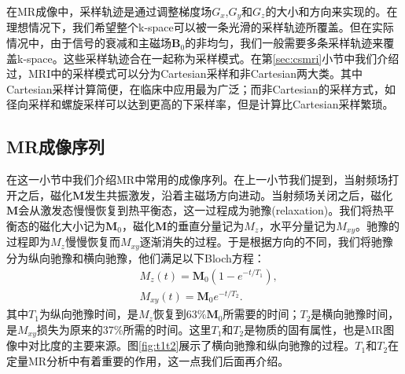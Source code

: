 在MR成像中，采样轨迹是通过调整梯度场$G_x$,$G_y$和$G_z$的大小和方向来实现的。在理想情况下，我们希望整个k-space可以被一条光滑的采样轨迹所覆盖。但在实际情况中，由于信号的衰减和主磁场$\mathrm{\textbf{B}}_0$的非均匀，我们一般需要多条采样轨迹来覆盖k-space。这些采样轨迹合在一起称为采样模式。在第\ref{sec:csmri}小节中我们介绍过，MRI中的采样模式可以分为Cartesian采样和非Cartesian两大类。其中Cartesian采样计算简便，在临床中应用最为广泛；而非Cartesian的采样方式，如径向采样和螺旋采样可以达到更高的下采样率，但是计算比Cartesian采样繁琐。

\subsection{MR成像序列}
在这一小节中我们介绍MR中常用的成像序列。在上一小节我们提到，当射频场打开之后，磁化$\mathrm{\textbf{M}}$发生共振激发，沿着主磁场方向进动。当射频场关闭之后，磁化$\mathrm{\textbf{M}}$会从激发态慢慢恢复到热平衡态，这一过程成为驰豫(relaxation)。我们将热平衡态的磁化大小记为$\mathrm{\textbf{M}}_0$，磁化$\mathrm{\textbf{M}}$的垂直分量记为$M_z$，水平分量记为$M_{xy}$。驰豫的过程即为$M_z$慢慢恢复而$M_{xy}$逐渐消失的过程。于是根据方向的不同，我们将驰豫分为纵向驰豫和横向驰豫，他们满足以下Bloch方程\cite{bloch}：
\begin{equation}
\begin{aligned}
	&M_z(t)=\mathrm{\textbf{M}}_0(1-e^{-t/T_1}),\\
	&M_{xy}(t)=\mathrm{\textbf{M}}_0e^{-t/T_2}.
\end{aligned}
\end{equation}
其中$T_1$为纵向弛豫时间，是$M_z$恢复到63\%$\mathrm{\textbf{M}}_0$所需要的时间；$T_2$是横向驰豫时间，是$M_{xy}$损失为原来的37\%所需的时间。这里$T_1$和$T_2$是物质的固有属性，也是MR图像中对比度的主要来源。图\ref{fig:t1t2}展示了横向驰豫和纵向驰豫的过程。$T_1$和$T_2$在定量MR分析中有着重要的作用，这一点我们后面再介绍。

